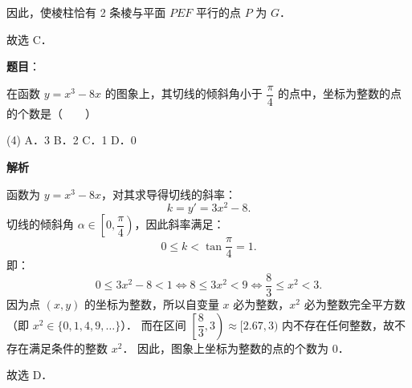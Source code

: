 \begin{answer}
因此，使棱柱恰有 2 条棱与平面 $PEF$ 平行的点 $P$ 为 $G$．

故选 C．


\end{answer}
\begin{answer}

\textbf{题目}：

在函数 $y = x^3 - 8x$ 的图象上，其切线的倾斜角小于 $\dfrac{\pi}{4}$ 的点中，坐标为整数的点的个数是\mbox{（　　）}

\begin{gkopts}(4)
\task A．3
\task B．2
\task C．1
\task D．0
\end{gkopts}

\textbf{解析}

函数为 $y = x^3 - 8x$，对其求导得切线的斜率：
\nopagebreak[4]
\[
k = y' = 3x^2 - 8.
\]
切线的倾斜角 $\alpha \in \left[0, \dfrac{\pi}{4}\right)$，因此斜率满足：
\nopagebreak[4]
\[
0 \leqslant k < \tan\frac{\pi}{4} = 1.
\]
即：
\nopagebreak[4]
\[
0 \leqslant 3x^2 - 8 < 1 \iff 8 \leqslant 3x^2 < 9 \iff \frac{8}{3} \leqslant x^2 < 3.
\]
因为点 $(x, y)$ 的坐标为整数，所以自变量 $x$ 必为整数，$x^2$ 必为整数完全平方数（即 $x^2 \in \{0, 1, 4, 9, \dots\}$）．
而在区间 $\left[\dfrac{8}{3}, 3\right) \approx [2.67, 3)$ 内不存在任何整数，故不存在满足条件的整数 $x^2$．
因此，图象上坐标为整数的点的个数为 0．

故选 D．


\end{answer}
